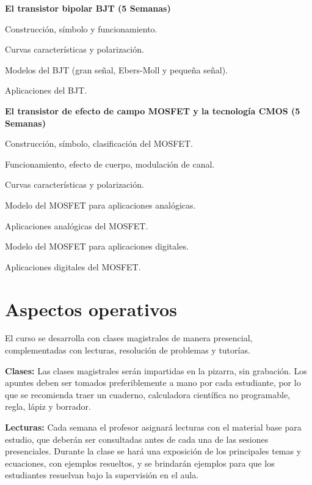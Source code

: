 \documentclass[11pt,oneside,letterpaper]{article}
\begin{document}
\begin{compactenum}[nolistsep]
\item \textbf{El transistor bipolar BJT (5 Semanas)}
  \begin{compactenum}[nolistsep]
  \item Construcción, símbolo y funcionamiento.
  \item Curvas características y polarización.
  \item Modelos del BJT (gran señal, Ebers-Moll y pequeña señal).
  \item Aplicaciones del BJT.
  \end{compactenum}

\item \textbf{El transistor de efecto de campo MOSFET y la tecnología CMOS (5 Semanas)}
  \begin{compactenum}[nolistsep]
  \item Construcción, símbolo, clasificación del MOSFET.
  \item Funcionamiento, efecto de cuerpo, modulación de canal.
  \item Curvas características y polarización.
  \item Modelo del MOSFET para aplicaciones analógicas.
  \item Aplicaciones analógicas del MOSFET.
  \item Modelo del MOSFET para aplicaciones digitales.
  \item Aplicaciones digitales del MOSFET.
  \end{compactenum}
  
\end{compactenum}


\newpage
\section{Aspectos operativos}

%
El curso se desarrolla con clases magistrales de manera presencial, complementadas con lecturas, resolución de problemas y tutorías.

\textbf{Clases:} Las clases magistrales serán impartidas en la pizarra, sin grabación. Los apuntes deben ser tomados preferiblemente a mano por cada estudiante, por lo que se recomienda traer un cuaderno, calculadora científica no programable, regla, lápiz y borrador.

\textbf{Lecturas:} Cada semana el profesor asignará lecturas con el material base para estudio, que deberán ser consultadas antes de cada una de las sesiones presenciales. Durante la clase se hará una exposición de los principales temas y ecuaciones, con ejemplos resueltos, y se brindarán ejemplos para que los estudiantes resuelvan bajo la supervisión en el aula.
\end{document}
